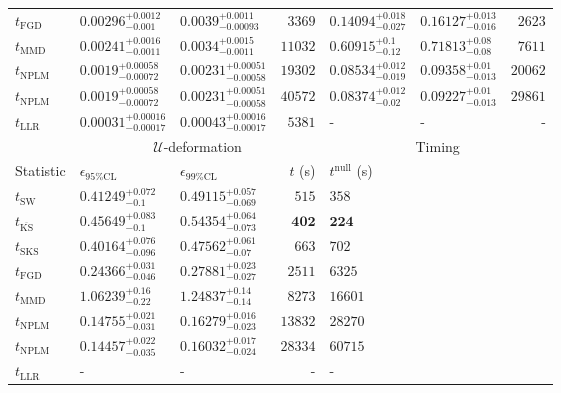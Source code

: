 \begin{tabular}{l|llr|llr}
	$t_{\mathrm{FGD}}$ & $0.00296_{-0.001}^{+0.0012}$ & $0.0039_{-0.00093}^{+0.0011}$ & $3369$ & ${\mathbf{0.14094_{-0.027}^{+0.018}}}$ & ${\mathbf{0.16127_{-0.016}^{+0.013}}}$ & $2623$ \\
	$t_{\mathrm{MMD}}$ & ${\mathbf{0.00241_{-0.0011}^{+0.0016}}}$ & ${\mathbf{0.0034_{-0.0011}^{+0.0015}}}$ & $11032$ & $0.60915_{-0.12}^{+0.1}$ & $0.71813_{-0.08}^{+0.08}$ & $7611$ \\
\rowcolor{red!35}	$t_{\mathrm{NPLM}}$ & $0.0019_{-0.00072}^{+0.00058}$ & $0.00231_{-0.00058}^{+0.00051}$ & $19302$ & $0.08534_{-0.019}^{+0.012}$ & $0.09358_{-0.013}^{+0.01}$ & $20062$ \\
\rowcolor{blue!35}	$t_{\mathrm{NPLM}}$ & $0.0019_{-0.00072}^{+0.00058}$ & $0.00231_{-0.00058}^{+0.00051}$ & $40572$ & $0.08374_{-0.02}^{+0.012}$ & $0.09227_{-0.013}^{+0.01}$ & $29861$ \\
	$t_{\mathrm{LLR}}$ & $0.00031_{-0.00017}^{+0.00016}$ & $0.00043_{-0.00017}^{+0.00016}$ & $5381$ & - & - & - \\
	\toprule
	\multicolumn{1}{c}{} & \multicolumn{3}{c}{$\mathcal{U}$-deformation} & \multicolumn{3}{c}{Timing} \\
	Statistic & $\epsilon_{95\%\mathrm{CL}}$ & $\epsilon_{99\%\mathrm{CL}}$ & $t$ (s) & $t^{\mathrm{null}}$ (s) \\
	\midrule
	$t_{\mathrm{SW}}$ & $0.41249_{-0.1}^{+0.072}$ & $0.49115_{-0.069}^{+0.057}$ & $515$ & $358$ \\
	$t_{\overline{\mathrm{KS}}}$ & $0.45649_{-0.1}^{+0.083}$ & $0.54354_{-0.073}^{+0.064}$ & ${\mathbf{402}}$ & ${\mathbf{224}}$ \\
	$t_{\mathrm{SKS}}$ & $0.40164_{-0.096}^{+0.076}$ & $0.47562_{-0.07}^{+0.061}$ & $663$ & $702$ \\
	$t_{\mathrm{FGD}}$ & ${\mathbf{0.24366_{-0.046}^{+0.031}}}$ & ${\mathbf{0.27881_{-0.027}^{+0.023}}}$ & $2511$ & $6325$ \\
	$t_{\mathrm{MMD}}$ & $1.06239_{-0.22}^{+0.16}$ & $1.24837_{-0.14}^{+0.14}$ & $8273$ & $16601$ \\
\rowcolor{red!35}	$t_{\mathrm{NPLM}}$ & $0.14755_{-0.031}^{+0.021}$ & $0.16279_{-0.023}^{+0.016}$ & $13832$ & $28270$ \\
\rowcolor{blue!35}	$t_{\mathrm{NPLM}}$ & $0.14457_{-0.035}^{+0.022}$ & $0.16032_{-0.024}^{+0.017}$ & $28334$ & $60715$ \\
	$t_{\mathrm{LLR}}$ & - & - & - & - \\
	\bottomrule
\end{tabular}